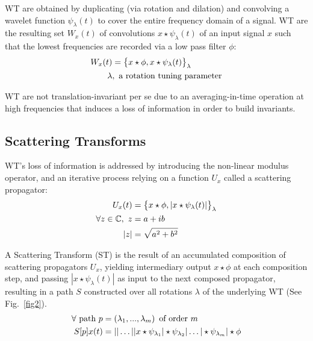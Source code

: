\documentclass[runningheads]{llncs}
\begin{document}
WT are obtained by duplicating (via rotation and dilation) and convolving a wavelet function $\psi_\lambda(t)$ to cover the entire frequency domain of a signal. WT are the resulting set $W_x(t)$ of convolutions $x\star\psi_\lambda(t)$ of an input signal $x$ such that the lowest frequencies are recorded via a low pass filter $\phi$\cite{mallatlecture}:
\begin{align}
W_x(t)&=\big\{x\star\phi, x\star\psi_\lambda(t)\big\}_\lambda\\
\lambda&,\,\,\text{a rotation tuning parameter}\notag
\end{align}

WT are not translation-invariant per se due to an averaging-in-time operation at high frequencies that induces a loss of information in order to build invariants.

\subsection{Scattering Transforms}

WT's loss of information is addressed by introducing the non-linear modulus operator, and an iterative process relying on a function $U_x$ called a scattering propagator\cite{bruna2012invariant}\cite{mallatlecture}:
\begin{align}
U_x(t)&=\big\{x\star\phi, |x\star\psi_\lambda(t)|\big\}_\lambda\\
\forall z \in \mathbb{C},\,\, z &= a + ib\notag\\
|z|&=\sqrt{a^2+b^2}\notag
\end{align}

A Scattering Transform (ST) is the result of an accumulated composition of scattering propagators $U_x$, yielding intermediary output $x\star\phi$ at each composition step, and passing $|x\star\psi_\lambda(t)|$ as input to the next composed propagator, resulting in a path $S$ constructed over all rotations $\lambda$ of the underlying WT (See Fig.~\ref{fig2}).
\begin{align}
\forall\text{ path }p&=(\lambda_1, ..., \lambda_m)\,\text{ of order $m$}\notag\\
S[p]x(t) &= ||\hdots||x\star\psi_{\lambda_1}|\star\psi_{\lambda_2}|\hdots|\star\psi_{\lambda_m}|\star\phi
\end{align}
\end{document}

